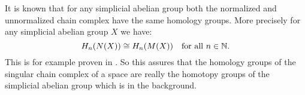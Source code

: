 It is known that for any simplicial abelian group both the normalized and unnormalized chain complex have the same homology groups. More precisely for any simplicial abelian group $X$ we have:
$$ H_n(N(X)) \cong H_n(M(X)) \quad\text{for all } n \in \mathbb{N}. $$
This is for example proven in \cite[Theorem 4.1]{eilenberg}. So this assures that the homology groups of the singular chain complex of a space are really the homotopy groups of the simplicial abelian group which is in the background.
